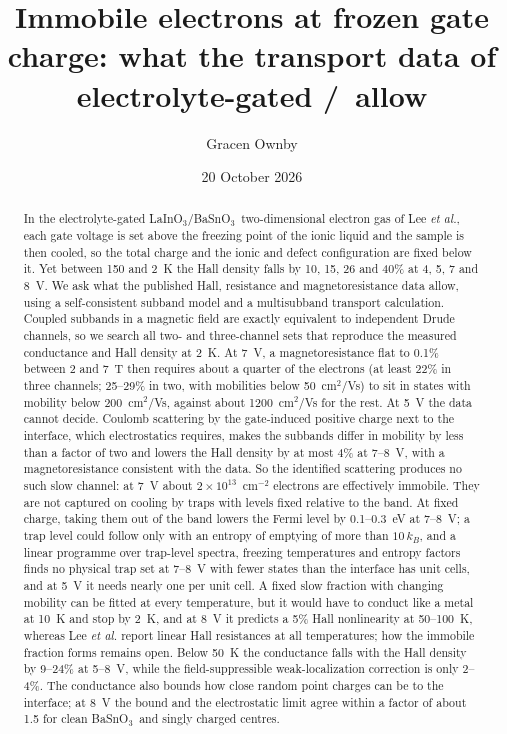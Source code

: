 \documentclass[11pt]{article}
\title{Immobile electrons at frozen gate charge: what the transport data of electrolyte-gated \LIO/\BSO\ allow}
\author{Gracen Ownby}
\affil{University of Oklahoma, Norman, Oklahoma, USA}
\date{\small 20 October 2026}
\newcommand{\LIO}{\texorpdfstring{LaInO$_3$}{LaInO3}}
\newcommand{\BSO}{\texorpdfstring{BaSnO$_3$}{BaSnO3}}
\begin{document}
\maketitle

\begin{abstract}
In the electrolyte-gated \LIO/\BSO\ two-dimensional electron gas of Lee \emph{et al.}, each gate voltage is set above the freezing point of the ionic liquid and the sample is then cooled, so the total charge and the ionic and defect configuration are fixed below it. Yet between 150 and 2~K the Hall density falls by 10, 15, 26 and 40\% at 4, 5, 7 and 8~V. We ask what the published Hall, resistance and magnetoresistance data allow, using a self-consistent subband model and a multisubband transport calculation. Coupled subbands in a magnetic field are exactly equivalent to independent Drude channels, so we search all two- and three-channel sets that reproduce the measured conductance and Hall density at 2~K. At 7~V, a magnetoresistance flat to 0.1\% between 2 and 7~T then requires about a quarter of the electrons (at least 22\% in three channels; 25--29\% in two, with mobilities below 50~cm$^2$/Vs) to sit in states with mobility below 200~cm$^2$/Vs, against about 1200~cm$^2$/Vs for the rest. At 5~V the data cannot decide. Coulomb scattering by the gate-induced positive charge next to the interface, which electrostatics requires, makes the subbands differ in mobility by less than a factor of two and lowers the Hall density by at most 4\% at 7--8~V, with a magnetoresistance consistent with the data. So the identified scattering produces no such slow channel: at 7~V about $2\times10^{13}$~cm$^{-2}$ electrons are effectively immobile. They are not captured on cooling by traps with levels fixed relative to the band. At fixed charge, taking them out of the band lowers the Fermi level by 0.1--0.3~eV at 7--8~V; a trap level could follow only with an entropy of emptying of more than $10\,k_B$, and a linear programme over trap-level spectra, freezing temperatures and entropy factors finds no physical trap set at 7--8~V with fewer states than the interface has unit cells, and at 5~V it needs nearly one per unit cell. A fixed slow fraction with changing mobility can be fitted at every temperature, but it would have to conduct like a metal at 10~K and stop by 2~K, and at 8~V it predicts a 5\% Hall nonlinearity at 50--100~K, whereas Lee \emph{et al.} report linear Hall resistances at all temperatures; how the immobile fraction forms remains open. Below 50~K the conductance falls with the Hall density by 9--24\% at 5--8~V, while the field-suppressible weak-localization correction is only 2--4\%. The conductance also bounds how close random point charges can be to the interface; at 8~V the bound and the electrostatic limit agree within a factor of about 1.5 for clean \BSO\ and singly charged centres.
\end{abstract}
\end{document}
